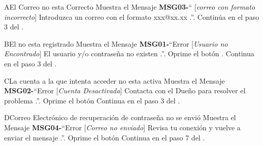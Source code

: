 	\begin{UCtrayectoriaA}{A}{El Correo no esta Correcto}
			\UCpaso Muestra el Mensaje {\bf MSG03-}`` [{\em correo con formato incorrecto}] Introduzca un correo con el formato xxx@xx.xx .''.
			\UCpaso Continúa en el paso 3 del .
		\end{UCtrayectoriaA}
		\begin{UCtrayectoriaA}{B}{El \UCactor no esta registrado}
			\UCpaso Muestra el Mensaje {\bf MSG01-}``Error [{\em Usuario no Encontrado}] El usuario y/o contraseña no existen .''.
			\UCpaso[\UCactor] Oprime el botón .
			\UCpaso[] Continua en el paso 3 del .
		\end{UCtrayectoriaA}		
		\begin{UCtrayectoriaA}{C}{La cuenta a la que intenta acceder no esta activa}
			\UCpaso Muestra el Mensaje {\bf MSG02-}``Error [{\em Cuenta Desactivada}] Contacta con el Dueño para resolver el problema .''.
			\UCpaso[\UCactor] Oprime el botón 
			\UCpaso Continua en el paso 3 del .
		\end{UCtrayectoriaA}
	\begin{UCtrayectoriaA}{D}{Correo Electrónico de recuperación de contraseña no se envió}
			\UCpaso Muestra el Mensaje {\bf MSG04-}``Error [{\em Correo no enviado}] Revisa tu conexión y vuelve a enviar el mensaje .''.
			\UCpaso[\UCactor] Oprime el botón 
			\UCpaso Continua en el paso 7 del .
		\end{UCtrayectoriaA}


		
